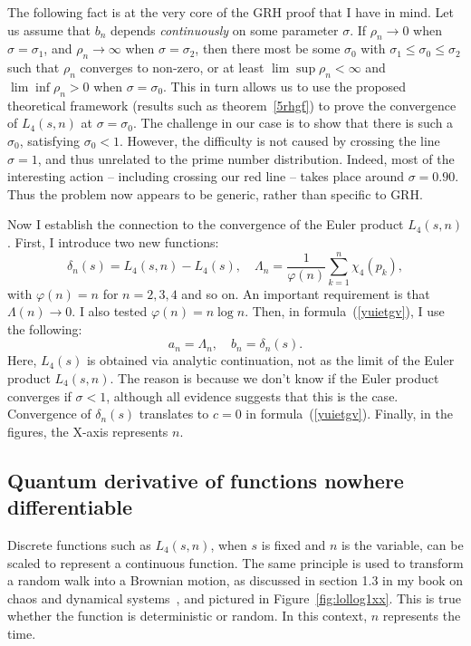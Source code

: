 \documentclass[oneside,10pt]{book}
\begin{document}
The following fact is at the very core of the GRH proof that I have in mind. Let us assume that $b_n$ depends 
{\em continuously} on some parameter $\sigma$.
 If $\rho_n\rightarrow 0$ when $\sigma = \sigma_1$, and $\rho_n\rightarrow \infty$ when $\sigma = \sigma_2$,
 then there most be some $\sigma_0$ 
 with $\sigma_1 \leq \sigma_0\leq \sigma_2$ such that $\rho_n$ converges to non-zero, or at least $\lim\sup \rho_n<\infty$ and $\lim\inf \rho_n>0$ when $\sigma=\sigma_0$. 
 This in turn allows us to use the proposed theoretical framework (results such as theorem~\ref{5rhgf}) to prove the
 convergence of $L_4(s, n)$ at $\sigma = \sigma_0$. The challenge in our case is to 
 show that there is such a $\sigma_0$,  satisfying $\sigma_0< 1$.  However, the difficulty is not caused by crossing the line $\sigma=1$, and thus unrelated to the prime number distribution. Indeed, most of the interesting action -- including crossing our red line -- takes place around 
$\sigma=0.90$. Thus the problem now appears to be generic,  rather than specific to GRH.

Now I establish the connection to the convergence of the Euler product $L_4(s, n)$. First, I introduce two new functions: 
\begin{equation}
\delta_n(s) = L_4(s,n)-L_4(s), \quad \Lambda_n = \frac{1}{\varphi(n)} \sum_{k=1}^n \chi_4(p_k),\label{8c3jfcd}
\end{equation}
 with  $\varphi(n) = n$ for $ n = 2, 3, 4$ and so on. An important requirement is that $\Lambda(n) \rightarrow 0$.  I also tested $\varphi(n) = n\log n$. Then, in formula~(\ref{yuietgv}), I use the following:
\begin{equation}
a_n = \Lambda_n, \quad b_n = \delta_n(s).\label{oi7xc}
\end{equation}
Here, $L_4(s)$ is obtained via analytic continuation, not as the limit of the Euler product $L_4(s, n)$. The reason is because
 we don't know if the Euler product converges if $\sigma <1$, although all evidence suggests that this is the case. 
 Convergence of $\delta_n(s)$ translates to $c=0$ in formula~(\ref{yuietgv}). Finally, in the figures, the X-axis represents $n$.

\subsection{Quantum derivative of functions nowhere differentiable}

Discrete functions such as $L_4(s,n)$, when $s$ is fixed and $n$ is the variable, can be scaled to represent a continuous function. 
 The same principle is used to transform a \textcolor{index}{random walk} into a 
 \textcolor{index}{Brownian motion}, as discussed in section 1.3 in my book 
 on chaos and dynamical systems~\cite{vgchaos}, and pictured in Figure~\ref{fig:lollog1xx}. This is true whether the function is deterministic or random. 
In this context, $n$ represents the time.
\end{document}
